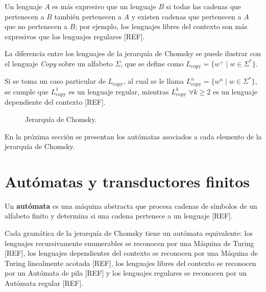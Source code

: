 \documentclass{report}
\theoremstyle{definition}
\theoremstyle{plain}
\theoremstyle{remark}
\begin{document}
Un lenguaje $A$ es más expresivo que un lenguaje $B$ si todas las cadenas que
pertenecen a $B$ también pertenecen a $A$ y existen cadenas que pertenecen a
$A$ que no pertenecen a $B$; por ejemplo, los lenguajes libres del contexto son
más expresivos que los lenguajes regulares [REF].

La diferencia entre los lenguajes de la jerarquía de Chomsky se puede ilustrar
con el lenguaje \textit{Copy} sobre un alfabeto $\Sigma$, que se define como
$L_{\mathrm{copy}} = \{w^+ \mid w \in \Sigma^*\}$.

Si se toma un caso particular de $L_{\mathrm{copy}}$, al cual se le llama
$L_{\mathrm{copy}}^n = \{w^n \mid w \in \Sigma^*\}$, se cumple que
$L_{\mathrm{copy}}^1$ es un lenguaje regular, mientras $L_{\mathrm{copy}}^k$
$\forall k \ge 2$ es un lenguaje dependiente del contexto [REF].

\begin{figure}[H]
\centering
{}
\caption{Jerarquía de Chomsky.}
\label{fig:chomsky}
\end{figure}

En la próxima sección se presentan los autómatas asociados a cada elemento de
la jerarquía de Chomsky.

\section{Autómatas y transductores finitos}
\label{sec:automatas}

Un \textbf{autómata} es una máquina abstracta que procesa cadenas de
símbolos de un alfabeto finito y determina si una cadena pertenece a un
lenguaje [REF].

Cada gramática de la jerarquía de Chomsky tiene un autómata equivalente: los
lenguajes recursivamente enumerables se reconocen por una Máquina de Turing
[REF], los lenguajes dependientes del contexto se reconocen por una Máquina de
Turing linealmente acotada [REF], los lenguajes libres del contexto se
reconocen por un Autómata de pila [REF] y los lenguajes regulares se reconocen
por un Autómata regular [REF].
\end{document}
